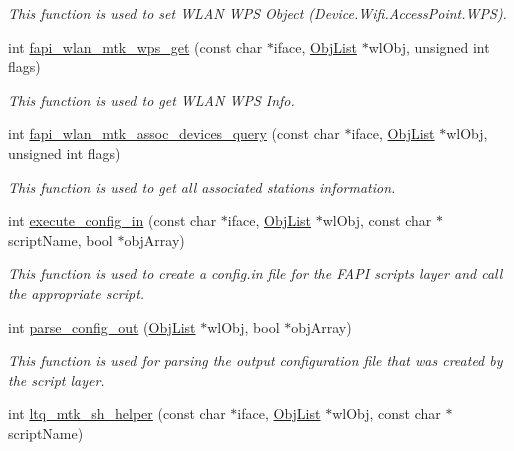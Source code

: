 \begin{DoxyCompactItemize}
\begin{DoxyCompactList}\small\item\em This function is used to set W\-L\-A\-N W\-P\-S Object (Device.\-Wifi.\-Access\-Point.\-W\-P\-S). \end{DoxyCompactList}\item 
int \hyperlink{group__FAPI__WLAN__MTK_gab8668d80972efa350233ceb8488d8646}{fapi\-\_\-wlan\-\_\-mtk\-\_\-wps\-\_\-get} (const char $\ast$iface, \hyperlink{structObjList}{Obj\-List} $\ast$wl\-Obj, unsigned int flags)
\begin{DoxyCompactList}\small\item\em This function is used to get W\-L\-A\-N W\-P\-S Info. \end{DoxyCompactList}\item 
int \hyperlink{group__FAPI__WLAN__MTK_ga4090a67332a33634f88ce8ee4c82196e}{fapi\-\_\-wlan\-\_\-mtk\-\_\-assoc\-\_\-devices\-\_\-query} (const char $\ast$iface, \hyperlink{structObjList}{Obj\-List} $\ast$wl\-Obj, unsigned int flags)
\begin{DoxyCompactList}\small\item\em This function is used to get all associated stations information. \end{DoxyCompactList}\item 
int \hyperlink{group__FAPI__WLAN__MTK_ga8f6373889d77d98b133e979536b1b537}{execute\-\_\-config\-\_\-in} (const char $\ast$iface, \hyperlink{structObjList}{Obj\-List} $\ast$wl\-Obj, const char $\ast$script\-Name, bool $\ast$obj\-Array)
\begin{DoxyCompactList}\small\item\em This function is used to create a config.\-in file for the F\-A\-P\-I scripts layer and call the appropriate script. \end{DoxyCompactList}\item 
int \hyperlink{group__FAPI__WLAN__MTK_gac0e3dab1382570b830571575cdfab26a}{parse\-\_\-config\-\_\-out} (\hyperlink{structObjList}{Obj\-List} $\ast$wl\-Obj, bool $\ast$obj\-Array)
\begin{DoxyCompactList}\small\item\em This function is used for parsing the output configuration file that was created by the script layer. \end{DoxyCompactList}\item 
int \hyperlink{group__FAPI__WLAN__MTK_gaddcf86d264b43cf438190c97fe1afc52}{ltq\-\_\-mtk\-\_\-sh\-\_\-helper} (const char $\ast$iface, \hyperlink{structObjList}{Obj\-List} $\ast$wl\-Obj, const char $\ast$script\-Name)

\end{DoxyCompactItemize}
